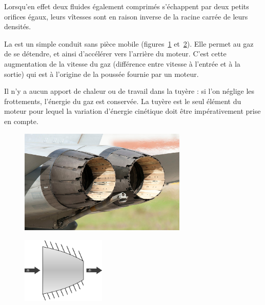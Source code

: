 			Lorsqu’en effet deux fluides également comprimés s’échappent par deux petits orifices égaux, leurs vîtesses sont en raison inverse de la racine carrée de leurs \mbox{densités}.%

		La  est un simple conduit sans pièce mobile (figures~\ref{fig_illustration_tuyere1} et~\ref{fig_illustration_tuyere2}). Elle permet au gaz de se détendre, et ainsi d’accélérer vers l’arrière du moteur. C’est cette augmentation de la vitesse du gaz (différence entre vitesse à l’entrée et à la sortie) qui est à l’origine de la poussée fournie par un moteur.

		Il n’y a aucun apport de chaleur ou de travail dans la tuyère : si l’on néglige les frottements, l’énergie du gaz est conservée. La tuyère est le seul élément du moteur pour lequel la variation d’énergie cinétique doit être impérativement prise en compte.

		\begin{figure}
			\begin{center}
				\includegraphics[width=8cm]{images/photo_tuyere.jpg}
			\end{center}
			\label{fig_illustration_tuyere1}
		\end{figure}

		\begin{figure}
			\begin{center}
				\includegraphics[width=4cm]{images/symbole_tuyere.png}
			\end{center}
			\label{fig_illustration_tuyere2}
		\end{figure}

